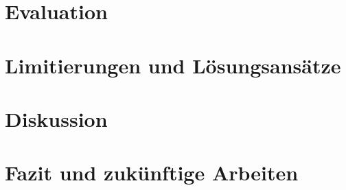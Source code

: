 \documentclass[pdftex,12pt,a4paper]{report}
\begin{document}

\chapter{Evaluation}
\label{chp:evaluation}



\chapter{Limitierungen und Lösungsansätze}
\label{chp:conflicts}



\chapter{Diskussion}
\label{chp:discussion}



\chapter{Fazit und zukünftige Arbeiten}
\label{chp:fazit}



\appendix






    


\nocite{zureiki2008stereo}
\nocite{opencvoreilly}
\nocite{cyganek2011introduction}

\end{document}
